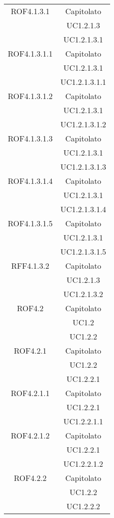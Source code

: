 \begin{longtable}{|c|c|}
\midrule
ROF4.1.3.1
& Capitolato\\
& UC1.2.1.3\\
& UC1.2.1.3.1\\

\midrule
ROF4.1.3.1.1
& Capitolato\\
& UC1.2.1.3.1\\
& UC1.2.1.3.1.1\\

\midrule
ROF4.1.3.1.2
& Capitolato\\
& UC1.2.1.3.1\\
& UC1.2.1.3.1.2\\

\midrule
ROF4.1.3.1.3
& Capitolato\\
& UC1.2.1.3.1\\
& UC1.2.1.3.1.3\\

\midrule
ROF4.1.3.1.4
& Capitolato\\
& UC1.2.1.3.1\\
& UC1.2.1.3.1.4\\

\midrule
ROF4.1.3.1.5
& Capitolato\\
& UC1.2.1.3.1\\
& UC1.2.1.3.1.5\\

\midrule
RFF4.1.3.2
& Capitolato\\
& UC1.2.1.3\\
& UC1.2.1.3.2\\

\midrule
ROF4.2
& Capitolato\\
& UC1.2\\
& UC1.2.2\\

\midrule
ROF4.2.1
& Capitolato\\
& UC1.2.2\\
& UC1.2.2.1\\

\midrule
ROF4.2.1.1
& Capitolato\\
& UC1.2.2.1\\
& UC1.2.2.1.1\\

\midrule
ROF4.2.1.2
& Capitolato\\
& UC1.2.2.1\\
& UC1.2.2.1.2\\

\midrule
ROF4.2.2
& Capitolato\\
& UC1.2.2\\
& UC1.2.2.2\\


\end{longtable}
